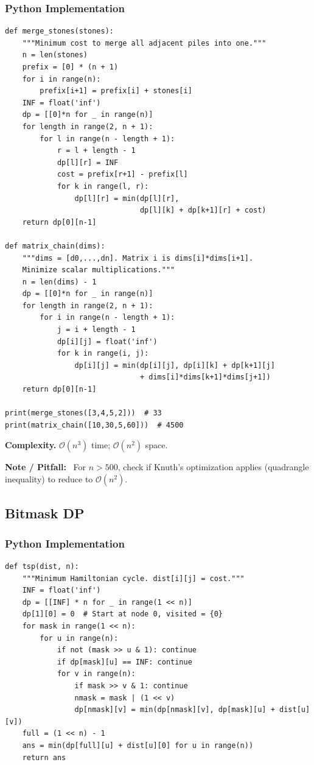 \documentclass[10pt,a4paper]{article}
\theoremstyle{cpstyle}
\newenvironment{cpnote}{%
  \begin{mdframed}[backgroundcolor=notebg, linecolor=orange!70, linewidth=1pt,
    innerleftmargin=10pt, innerrightmargin=10pt, innertopmargin=6pt, innerbottommargin=6pt]
  \textbf{\color{orange!80!black}Note / Pitfall:}~}{%
  \end{mdframed}}
\newcommand{\bigO}[1]{\mathcal{O}\!\left(#1\right)}
\begin{document}
\subsubsection{Python Implementation}
\begin{lstlisting}[caption={Interval DP -- merge stones and matrix chain}]
def merge_stones(stones):
    """Minimum cost to merge all adjacent piles into one."""
    n = len(stones)
    prefix = [0] * (n + 1)
    for i in range(n):
        prefix[i+1] = prefix[i] + stones[i]
    INF = float('inf')
    dp = [[0]*n for _ in range(n)]
    for length in range(2, n + 1):
        for l in range(n - length + 1):
            r = l + length - 1
            dp[l][r] = INF
            cost = prefix[r+1] - prefix[l]
            for k in range(l, r):
                dp[l][r] = min(dp[l][r],
                               dp[l][k] + dp[k+1][r] + cost)
    return dp[0][n-1]

def matrix_chain(dims):
    """dims = [d0,...,dn]. Matrix i is dims[i]*dims[i+1].
    Minimize scalar multiplications."""
    n = len(dims) - 1
    dp = [[0]*n for _ in range(n)]
    for length in range(2, n + 1):
        for i in range(n - length + 1):
            j = i + length - 1
            dp[i][j] = float('inf')
            for k in range(i, j):
                dp[i][j] = min(dp[i][j], dp[i][k] + dp[k+1][j]
                               + dims[i]*dims[k+1]*dims[j+1])
    return dp[0][n-1]

print(merge_stones([3,4,5,2]))  # 33
print(matrix_chain([10,30,5,60]))  # 4500
\end{lstlisting}

\textbf{Complexity.} $\bigO{n^3}$ time; $\bigO{n^2}$ space.

\begin{cpnote}
For $n > 500$, check if Knuth's optimization applies (quadrangle inequality) to reduce to $\bigO{n^2}$.
\end{cpnote}

\subsection{Bitmask DP}

\subsubsection{Python Implementation}
\begin{lstlisting}[caption={TSP via Bitmask DP}]
def tsp(dist, n):
    """Minimum Hamiltonian cycle. dist[i][j] = cost."""
    INF = float('inf')
    dp = [[INF] * n for _ in range(1 << n)]
    dp[1][0] = 0  # Start at node 0, visited = {0}
    for mask in range(1 << n):
        for u in range(n):
            if not (mask >> u & 1): continue
            if dp[mask][u] == INF: continue
            for v in range(n):
                if mask >> v & 1: continue
                nmask = mask | (1 << v)
                dp[nmask][v] = min(dp[nmask][v], dp[mask][u] + dist[u][v])
    full = (1 << n) - 1
    ans = min(dp[full][u] + dist[u][0] for u in range(n))
    return ans
\end{lstlisting}
\end{document}
